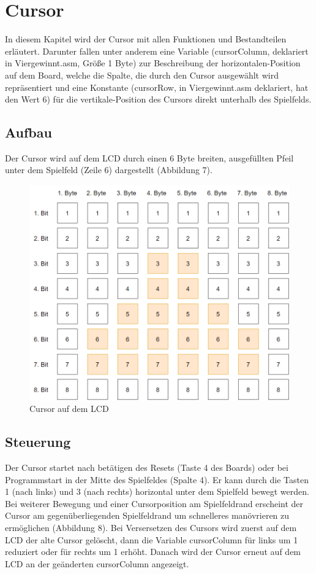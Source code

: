 \newpage
\section{Cursor}
    In diesem Kapitel wird der Cursor mit allen Funktionen und Bestandteilen erläutert.
    Darunter fallen unter anderem eine Variable (cursorColumn, deklariert in Viergewinnt.asm, Größe 1 Byte)
    zur Beschreibung der horizontalen-Position auf dem Board, welche die Spalte, die durch den Cursor ausgewählt wird repräsentiert und eine Konstante
    (cursorRow, in Viergewinnt.asm deklariert, hat den Wert 6) für die vertikale-Position des Cursors direkt unterhalb des Spielfelds.

    \subsection{Aufbau}
        Der Cursor wird auf dem LCD durch einen 6 Byte breiten, ausgefüllten Pfeil unter dem Spielfeld (Zeile 6) dargestellt (Abbildung 7).

        \begin{figure}[H]
            \centering
            \includegraphics[scale=0.35]{img/cursor.png}    
            \caption{Cursor auf dem LCD}
        \end{figure}
    
    \subsection{Steuerung}
        Der Cursor startet nach betätigen des Resets (Taste 4 des Boards) oder bei Programmstart in der Mitte des Spielfeldes (Spalte 4).
        Er kann durch die Tasten 1 (nach links) und 3 (nach rechts) horizontal unter dem Spielfeld bewegt werden.
        Bei weiterer Bewegung und einer Cursorposition am Spielfeldrand erscheint der Cursor am gegenüberliegenden Spielfeldrand um schnelleres manövrieren zu ermöglichen (Abbildung 8).
        Bei Versersetzen des Cursors wird zuerst auf dem LCD der alte Cursor gelöscht,
        dann die Variable cursorColumn für links um 1 reduziert oder für rechts um 1 erhöht.
        Danach wird der Cursor erneut auf dem LCD an der geänderten cursorColumn angezeigt.

